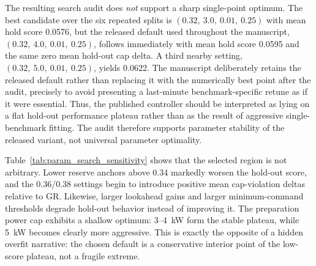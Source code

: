 \documentclass[preprint,12pt]{elsarticle}
\begin{document}
The resulting search audit does \emph{not} support a sharp single-point optimum. The best candidate over the six repeated splits is $(0.32,\ 3.0,\ 0.01,\ 0.25)$ with mean hold score 0.0576, but the released default used throughout the manuscript, $(0.32,\ 4.0,\ 0.01,\ 0.25)$, follows immediately with mean hold score 0.0595 and the same zero mean hold-out cap delta. A third nearby setting, $(0.32,\ 5.0,\ 0.01,\ 0.25)$, yields 0.0622. The manuscript deliberately retains the released default rather than replacing it with the numerically best point after the audit, precisely to avoid presenting a last-minute benchmark-specific retune as if it were essential. Thus, the published controller should be interpreted as lying on a flat hold-out performance plateau rather than as the result of aggressive single-benchmark fitting. The audit therefore supports parameter stability of the released variant, not universal parameter optimality.

\begin{table}[H]
\centering
\caption{Grouped sensitivity of the four searched aggressiveness parameters over the 20-profile cross-tier parameter audit. Entries report mean hold-out score versus GR (lower is better) and mean hold-out cap-violation delta versus GR.}
\label{tab:param_search_sensitivity}
\footnotesize
\setlength{\tabcolsep}{4pt}
\end{table}

Table~\ref{tab:param_search_sensitivity} shows that the selected region is not arbitrary. Lower reserve anchors above 0.34 markedly worsen the hold-out score, and the 0.36/0.38 settings begin to introduce positive mean cap-violation deltas relative to GR. Likewise, larger lookahead gains and larger minimum-command thresholds degrade hold-out behavior instead of improving it. The preparation power cap exhibits a shallow optimum: 3--4~kW form the stable plateau, while 5~kW becomes clearly more aggressive. This is exactly the opposite of a hidden overfit narrative: the chosen default is a conservative interior point of the low-score plateau, not a fragile extreme.
\end{document}
